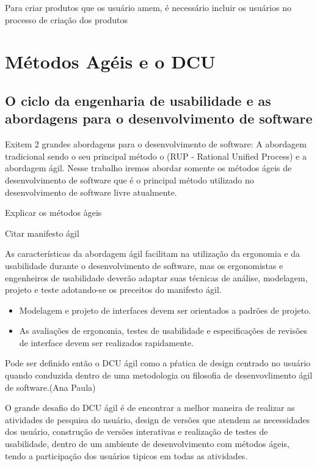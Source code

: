 
Para criar produtos que os usuário amem, é necessário incluir os usuários no processo de criação dos produtos \cite{travis2013}




\section{Métodos Agéis e o DCU}

\subsection{O ciclo da engenharia de usabilidade e as abordagens para o desenvolvimento de software}

	Exitem 2 grandes abordagens para o desenvolvimento de software: A abordagem tradicional sendo o seu principal método o (RUP - Rational Unified Process) e a abordagem ágil.
	Nesse trabalho iremos abordar somente os métodos ágeis de desenvolvimento de software que é o principal método utilizado no desenvolvimento de software livre atualmente.

Explicar os métodos àgeis

Citar manifesto ágil

As características da abordagem ágil facilitam na utilização da ergonomia e da usabilidade durante o desenvolvimento de software, mas os ergonomistas e engenheiros de usabilidade deverão adaptar suas técnicas de análise, modelagem, projeto e teste adotando-se os preceitos do manifesto ágil. ~\cite{cybis2010}

\begin{itemize}
\item Modelagem e projeto de interfaces devem ser orientados a padrões de projeto.
\item As avaliações de ergonomia, testes de usabilidade e especificações de revisões de interface devem ser realizados rapidamente.
\end{itemize}

Pode ser definido então o DCU ágil como a pŕatica de design centrado no usuário quando conduzida dentro de uma metodologia ou filosofia de desenvovlimento ágil de software.(Ana Paula)

O grande desafio do DCU ágil é de encontrar a melhor maneira de realizar as atividades de pesquisa do usuário, design de versões que atendem as necessidades dos usuário, construção de versões interativas e realização de testes de usabilidade, dentro de um ambiente de desenvolvimento com métodos ágeis, tendo a participação dos usuários tipicos em todas as atividades. %

